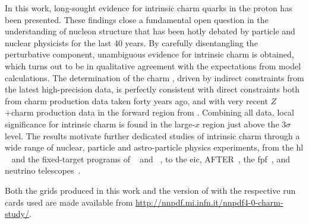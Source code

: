 
In this work, long-sought evidence for intrinsic charm quarks
in the proton has been presented.
%
These findings close a fundamental open question in the understanding of
nucleon structure that has been hotly debated by particle and nuclear
physicists for the last 40 years.
%
By carefully disentangling the perturbative component, unambiguous
evidence for intrinsic charm is obtained, which turns out to be in qualitative
agreement with the expectations from model calculations.
%
The determination of the charm \pdf, driven by indirect constraints from the 
latest high-precision \lhc data, is perfectly consistent with direct
constraints both from \emc charm production data taken forty years ago, and
with very recent $Z$+charm production data in the forward region from \lhcb.
%
Combining all data, local significance for intrinsic charm is found in the
large-$x$ region just above the $3\sigma$ level.
%
The results motivate further dedicated studies of intrinsic charm through a
wide range of nuclear, particle and astro-particle physics experiments, from
the \acrlong{hl} \lhc~\cite{Azzi:2019yne} and the fixed-target programs of
\lhcb~\cite{LHCb:2018jry} and \alice~\cite{QCDWorkingGroup:2019dyv}, to the  
\acrlong{eic}, AFTER~\cite{Hadjidakis:2018ifr}, the
\acrlong{fpf}~\cite{Anchordoqui:2021ghd}, and neutrino
telescopes~\cite{Halzen:2016thi}.

Both the \lhapdf grids produced in this work and the version of \eko with the
respective run cards used are made available from
\url{http://nnpdf.mi.infn.it/nnpdf4-0-charm-study/}.

